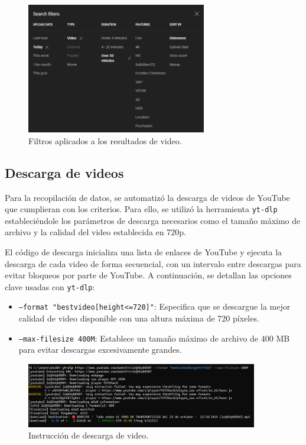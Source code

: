 \begin{figure}[H]
    \centering
    \includegraphics[width=0.70\textwidth]{4/figures/Extraccion_3.png}
    \caption{Filtros aplicados a los resultados de video.}
    \label{fig:convolucion}
\end{figure}

\subsection{Descarga de videos}

Para la recopilación de datos, se automatizó la descarga de videos de YouTube que cumplieran con los criterios. Para ello, se utilizó la herramienta \texttt{yt-dlp} estableciéndole los parámetros de descarga necesarios como el tamaño máximo de archivo y la calidad del video establecida en 720p.

El código de descarga inicializa una lista de enlaces de YouTube y ejecuta la descarga de cada video de forma secuencial, con un intervalo entre descargas para evitar bloqueos por parte de YouTube. A continuación, se detallan las opciones clave usadas con \texttt{yt-dlp}:

\begin{itemize}
    \item \texttt{--format "bestvideo[height<=720]"}: Especifica que se descargue la mejor calidad de video disponible con una altura máxima de 720 píxeles.
    \item \texttt{--max-filesize 400M}: Establece un tamaño máximo de archivo de 400 MB para evitar descargas excesivamente grandes.
\end{itemize}


\begin{figure}[H]
    \centering
    \includegraphics[width=0.90\textwidth]{4/figures/Descarga_1.png}
    \caption{Instrucción de descarga de video.}
    \label{fig:convolucion}
\end{figure}

